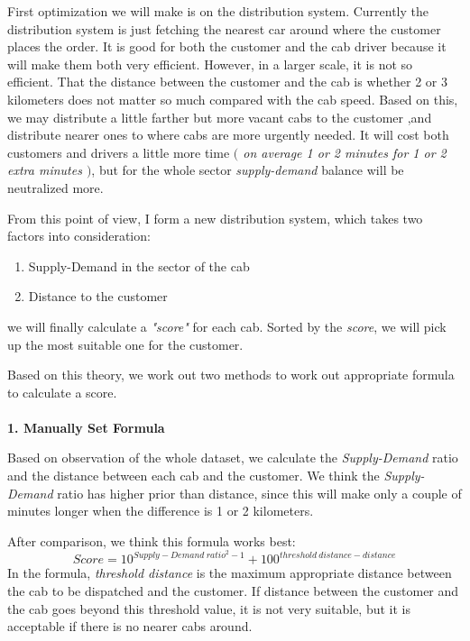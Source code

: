 \documentclass{article}
\begin{document}
\qquad First optimization we will make is on the distribution system. Currently the distribution system is just fetching the nearest car around where the customer places the order. It is good for both the customer and the cab driver because it will make them both very efficient. However, in a larger scale, it is not so efficient. That the distance between the customer and the cab is whether 2 or 3 kilometers does not matter so much compared with the cab speed. Based on this, we may distribute a little farther but more vacant cabs to the customer ,and distribute nearer ones to where cabs are more urgently needed. It will cost both customers and drivers a little more time \emph{$($ on average 1 or 2 minutes for 1 or 2 extra minutes $)$}, but for the whole sector \emph{supply-demand} balance will be neutralized more.

\qquad From this point of view, I form a new distribution system, which takes two factors into consideration:
\begin{enumerate}
\item Supply-Demand in the sector of the cab
\item Distance to the customer
\end{enumerate}
we will finally calculate a \emph{"score"} for each cab. Sorted by the \emph{score}, we will pick up the most suitable one for the customer.

\qquad Based on this theory, we work out two methods to work out appropriate formula to calculate a score.
\\\\
\textbf{1. Manually Set Formula}

\qquad Based on observation of the whole dataset, we calculate the \emph{Supply-Demand} ratio and the distance between each cab and the customer. We think the \emph{Supply-Demand} ratio has higher prior than distance, since this will make only a couple of minutes longer when the difference is 1 or 2 kilometers.

\qquad After comparison, we think this formula works best:
\begin{displaymath}
	Score = 10^{Supply-Demand\ ratio^2-1}+100^{threshold\ distance - distance}
\end{displaymath}
In the formula, \emph{threshold distance} is the maximum appropriate distance between the cab to be dispatched and the customer. If distance between the customer and the cab goes beyond this threshold value, it is not very suitable, but it is acceptable if there is no nearer cabs around.
\end{document}
